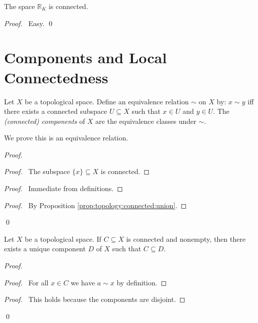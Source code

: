 \begin{prop}
The space $\mathbb{R}_K$ is connected.
\end{prop}

\begin{proof}
\pf\ Easy. \qed
\end{proof}

\section{Components and Local Connectedness}

\begin{df}
  Let $X$ be a topological space. Define an equivalence relation $\sim$ on
  $X$
  by: $x \sim y$ iff there exists a connected subspace $U \subseteq X$ such
  that $x \in U$ and $y \in U$. The \emph{(connected) components} of $X$ are
  the equivalence classes under $\sim$.

  We prove this is an equivalence relation.
\end{df}

\begin{proof}
  \pf
  \begin{proof}
    \pf\ The subspace $\{x\} \subseteq X$ is connected.
  \end{proof}
  \begin{proof}
    \pf\ Immediate from definitions.
  \end{proof}
  \begin{proof}
    \pf\ By Proposition \ref{prop:topology:connected:union}.
  \end{proof}
  \qed
\end{proof}

\begin{prop}
  \label{prop:topology:connected:subset}
  Let $X$ be a topological space. If $C \subseteq X$ is connected and
  nonempty, then there    exists a unique component $D$ of $X$ such that $C
  \subseteq D$.
\end{prop}

\begin{proof}
  \pf
  \begin{proof}
    \pf\ For all $x \in C$ we have $a \sim x$ by definition.
  \end{proof}
  \begin{proof}
    \pf\ This holds because the components are disjoint.
  \end{proof}
  \qed
\end{proof}


